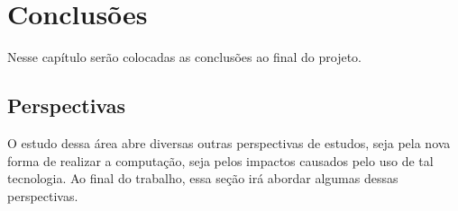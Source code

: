 \section{Conclusões}
Nesse capítulo serão colocadas as conclusões ao final do projeto.
\subsection{Perspectivas}
O estudo dessa área abre diversas outras perspectivas de estudos, seja pela nova forma de realizar a computação, seja pelos impactos causados pelo uso de tal tecnologia. Ao final do trabalho, essa seção irá abordar algumas dessas perspectivas. 

\newpage